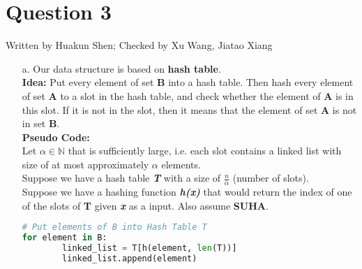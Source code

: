 \documentclass[10pt]{article}
\begin{document}
\section*{Question 3} Written by Huakun Shen; Checked by Xu Wang, Jiatao Xiang\\
\begin{enumerate}
\item[a.] Our data structure is based on \textbf{hash table}.\\
\textbf{Idea:} Put every element of set \textbf{B} into a hash table. Then hash every element of set \textbf{A} to a
slot in the hash table, and check whether the element of \textbf{A} is in this slot. If it is not in the slot, then it means that the element of set \textbf{A} is not in set \textbf{B}.\\
\textbf{Pseudo Code:}\\
Let $\alpha\in\mathbb{N}$ that is sufficiently large, i.e. each slot contains a linked list with size of at most approximately $\alpha$ elements.\\
Suppose we have a hash table \textbf{\textit{T}} with a size of $\frac{n}{\alpha}$ (number of slots).\\
Suppose we have a hashing function \textit{\textbf{h(x)}} that would return the index of one of the slots of \textbf{T} given \textbf{\textit{x}} as a input. Also assume \textbf{SUHA}.
\begin{lstlisting}[language=Python]
# Put elements of B into Hash Table T
for element in B:
		linked_list = T[h(element, len(T))]
		linked_list.append(element)
		

\end{lstlisting}
\end{enumerate}
\end{document}
